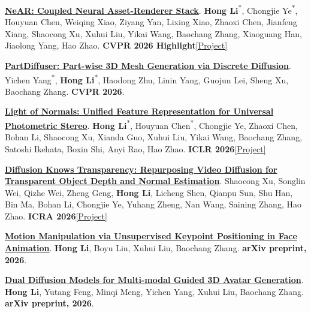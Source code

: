 \documentclass[10pt,a4paper]{article}
\newcommand{\EqContrib}{\textsuperscript{*}}
\newcommand{\reslink}[2]{\href{#1}{\textcolor{accent}{[#2]}}}
\begin{document}
\begin{enumerate}[leftmargin=1.6em,label={[\arabic*]},topsep=6pt,itemsep=7pt,parsep=0pt]
\item \href{https://near-project.github.io/}{\textbf{NeAR: Coupled Neural Asset-Renderer Stack}}. \textbf{Hong Li}\EqContrib, Chongjie Ye\EqContrib, Houyuan Chen, Weiqing Xiao, Ziyang Yan, Lixing Xiao, Zhaoxi Chen, Jianfeng Xiang, Shaocong Xu, Xuhui Liu, Yikai Wang, Baochang Zhang, Xiaoguang Han, Jiaolong Yang, Hao Zhao. \textcolor{accent}{\textbf{CVPR 2026 Highlight}}\enspace \reslink{https://near-project.github.io/}{Project}

\item \href{https://arxiv.org/abs/2511.18801}{\textbf{PartDiffuser: Part-wise 3D Mesh Generation via Discrete Diffusion}}. Yichen Yang\EqContrib, \textbf{Hong Li}\EqContrib, Haodong Zhu, Linin Yang, Guojun Lei, Sheng Xu, Baochang Zhang. \textcolor{accent}{\textbf{CVPR 2026}}.

\item \href{https://houyuanchen111.github.io/lino.github.io/}{\textbf{Light of Normals: Unified Feature Representation for Universal Photometric Stereo}}. \textbf{Hong Li}\EqContrib, Houyuan Chen\EqContrib, Chongjie Ye, Zhaoxi Chen, Bohan Li, Shaocong Xu, Xianda Guo, Xuhui Liu, Yikai Wang, Baochang Zhang, Satoshi Ikehata, Boxin Shi, Anyi Rao, Hao Zhao. \textcolor{accent}{\textbf{ICLR 2026}}\enspace \reslink{https://houyuanchen111.github.io/lino.github.io/}{Project}

\item \href{https://daniellli.github.io/projects/DKT/}{\textbf{Diffusion Knows Transparency: Repurposing Video Diffusion for Transparent Object Depth and Normal Estimation}}. Shaocong Xu, Songlin Wei, Qizhe Wei, Zheng Geng, \textbf{Hong Li}, Licheng Shen, Qianpu Sun, Shu Han, Bin Ma, Bohan Li, Chongjie Ye, Yuhang Zheng, Nan Wang, Saining Zhang, Hao Zhao. \textcolor{accent}{\textbf{ICRA 2026}}\enspace \reslink{https://daniellli.github.io/projects/DKT/}{Project}

\item \href{https://arxiv.org/abs/2603.04302}{\textbf{Motion Manipulation via Unsupervised Keypoint Positioning in Face Animation}}. \textbf{Hong Li}, Boyu Liu, Xuhui Liu, Baochang Zhang. \textcolor{accent}{\textbf{arXiv preprint, 2026}}.

\item \href{https://arxiv.org/abs/2603.04307}{\textbf{Dual Diffusion Models for Multi-modal Guided 3D Avatar Generation}}. \textbf{Hong Li}, Yutang Feng, Minqi Meng, Yichen Yang, Xuhui Liu, Baochang Zhang. \textcolor{accent}{\textbf{arXiv preprint, 2026}}.


\end{enumerate}
\end{document}
